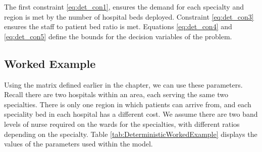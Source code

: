\documentclass[../thesis.tex]{subfiles}
\begin{document}
{%

The first constraint \eqref{eq:det_con1}, ensures the demand for each specialty and region is met by the number of hospital beds deployed. Constraint \eqref{eq:det_con3} ensures the staff to patient bed ratio is met. Equations \eqref{eq:det_con4} and \eqref{eq:det_con5} define the bounds for the decision variables of the problem.   

\subsection{Worked Example}
Using the matrix defined earlier in the chapter, we can use these parameters. Recall there are two hospitals within an area, each serving the same two specialties. There is only one region in which patients can arrive from, and each speciality bed in each hospital has a different cost. We assume there are two band levels of nurse required on the wards for the specialties, with different ratios depending on the specialty. Table \ref{tab:DeterministicWorkedExample} displays the values of the parameters used within the model.

}
\end{document}
